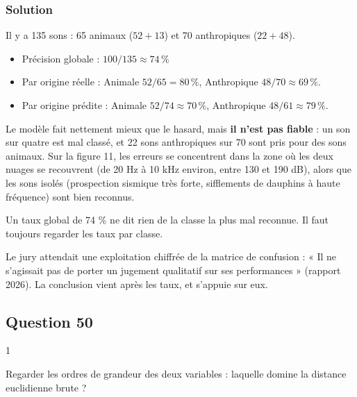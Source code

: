 \documentclass[11pt,a4paper]{article}
\providecommand{\tightlist}{\setlength{\itemsep}{0pt}\setlength{\parskip}{0pt}}
\begin{document}
\hypertarget{solution-48}{%
\subsubsection{Solution}\label{solution-48}}

Il y a 135 sons : 65 animaux (\(52 + 13\)) et 70 anthropiques (\(22 + 48\)).

\begin{itemize}
\tightlist
\item
  Précision globale : \(\boxed{100/135 \approx 74\,\%}\)
\item
  Par origine réelle : Animale \(52/65 = 80\,\%\), Anthropique \(48/70 \approx 69\,\%\).
\item
  Par origine prédite : Animale \(52/74 \approx 70\,\%\), Anthropique \(48/61 \approx 79\,\%\).
\end{itemize}

Le modèle fait nettement mieux que le hasard, mais \textbf{il n'est pas fiable} : un son sur quatre est mal classé, et 22 sons anthropiques sur 70 sont pris pour des sons animaux. Sur la figure 11, les erreurs se concentrent dans la zone où les deux nuages se recouvrent (de 20 Hz à 10 kHz environ, entre 130 et 190 dB), alors que les sons isolés (prospection sismique très forte, sifflements de dauphins à haute fréquence) sont bien reconnus.

\begin{piege}

Un taux global de 74 \% ne dit rien de la classe la plus mal reconnue. Il faut toujours regarder les taux par classe.

\end{piege}

\begin{jury}

Le jury attendait une exploitation chiffrée de la matrice de confusion : « Il ne s'agissait pas de porter un jugement qualitatif sur ses performances » (rapport 2026). La conclusion vient après les taux, et s'appuie sur eux.

\end{jury}

\hypertarget{question-50}{%
\subsection{Question 50}\label{question-50}}

\begin{indication}{1}

Regarder les ordres de grandeur des deux variables : laquelle domine la distance euclidienne brute ?

\end{indication}
\end{document}
